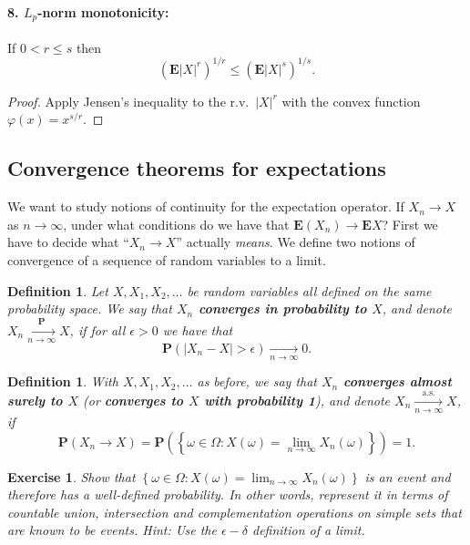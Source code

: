 \documentclass[12pt]{article}
\newtheorem{defi}[thm]{Definition}
\newtheorem{exercise}[thm]{Exercise}
\newcommand{\prob}{\mathbf{P}}
\newcommand{\expec}{\mathbf{E}}
\theoremstyle{example}
\begin{document}
\paragraph{8. $L_p$-norm monotonicity:} If $0<r\le s$ then 
\begin{equation}
 (\expec|X|^r)^{1/r} \le (\expec |X|^s)^{1/s}.
 \label{eq:lpnormmono}
 \end{equation}
\begin{proof} Apply Jensen's inequality to the r.v.\ $|X|^r$ with the convex function $\varphi(x) = x^{s/r}$.
\end{proof}

\subsection{Convergence theorems for expectations}

We want to study notions of continuity for the expectation operator. If $X_n\to X$ as $n\to\infty$, under what conditions do we have that $\expec(X_n)\to \expec X$? First we have to decide what ``$X_n\to X$'' actually \emph{means}. We define two notions of convergence of a sequence of random variables to a limit.

\begin{defi} Let $X, X_1, X_2, \ldots$ be random variables all defined on the same probability space. We say that \textbf{$X_n$ converges in probability to $X$}, and denote
$ X_n \xrightarrow[n\to\infty]{\prob} X$,
if for all $\epsilon>0$ we have that
$$ \prob(|X_n-X|>\epsilon) \xrightarrow[n\to\infty]{} 0. $$
\end{defi}

\begin{defi} With $X,X_1,X_2,\ldots$ as before, we say that \textbf{$X_n$ converges almost surely to $X$} (or \textbf{converges to $X$ with probability 1}), and denote $ X_n \xrightarrow[n\to\infty]{\textrm{a.s.}} X$,
if
$$ \prob( X_n \to X ) = \prob\left(\left\{ \omega \in \Omega : X(\omega)=\lim_{n\to\infty} X_n(\omega) \right\} \right) = 1. $$
\end{defi}

\begin{exercise} Show that $\left\{ \omega \in \Omega : X(\omega)=\lim_{n\to\infty} X_n(\omega) \right\}$ is an event and therefore has a well-defined probability. In other words, represent it in terms of countable union, intersection and complementation operations on simple sets that are known to be events. Hint: Use the $\epsilon-\delta$ definition of a limit.
\end{exercise}
\end{document}
